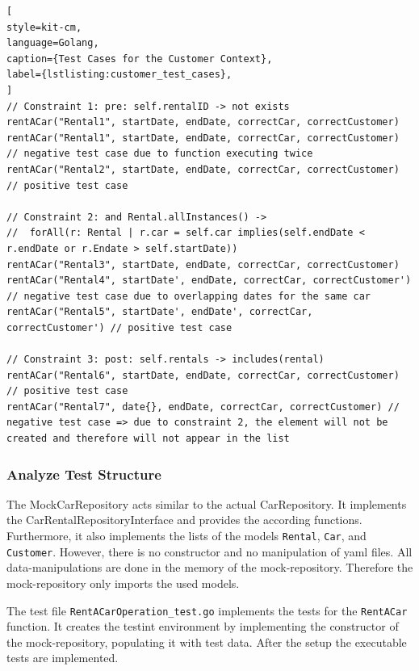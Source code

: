 \begin{lstlisting}[
style=kit-cm,
language=Golang,
caption={Test Cases for the Customer Context},
label={lstlisting:customer_test_cases},
]
// Constraint 1: pre: self.rentalID -> not exists
rentACar("Rental1", startDate, endDate, correctCar, correctCustomer)
rentACar("Rental1", startDate, endDate, correctCar, correctCustomer) // negative test case due to function executing twice
rentACar("Rental2", startDate, endDate, correctCar, correctCustomer) // positive test case

// Constraint 2: and Rental.allInstances() -> 
//  forAll(r: Rental | r.car = self.car implies(self.endDate < r.endDate or r.Endate > self.startDate))
rentACar("Rental3", startDate, endDate, correctCar, correctCustomer)
rentACar("Rental4", startDate', endDate, correctCar, correctCustomer') // negative test case due to overlapping dates for the same car
rentACar("Rental5", startDate', endDate', correctCar, correctCustomer') // positive test case 

// Constraint 3: post: self.rentals -> includes(rental)
rentACar("Rental6", startDate, endDate, correctCar, correctCustomer) // positive test case
rentACar("Rental7", date{}, endDate, correctCar, correctCustomer) // negative test case => due to constraint 2, the element will not be created and therefore will not appear in the list

\end{lstlisting}

\subsubsection*{Analyze Test Structure}
The MockCarRepository acts similar to the actual CarRepository.
It implements the CarRentalRepositoryInterface and provides the according functions.
Furthermore, it also implements the lists of the models \texttt{Rental}, \texttt{Car}, and \texttt{Customer}.
However, there is no constructor and no manipulation of yaml files.
All data-manipulations are done in the memory of the mock-repository.
Therefore the mock-repository only imports the used models.

The test file \texttt{RentACarOperation\_test.go} implements the tests for the \texttt{RentACar} function.
It creates the testint environment by implementing the constructor of the mock-repository, populating it with test data.
After the setup the executable tests are implemented.

